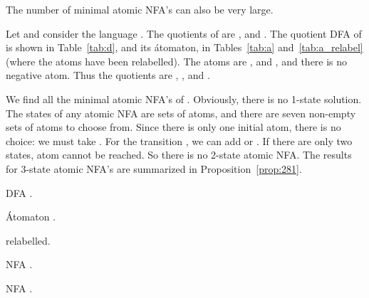 \documentclass{llncs}
\begin{document}
The number of minimal atomic NFA's can also be very large. 
\begin{example}
\label{ex:atomicminimal}
Let  and consider the language .
The quotients of  are ,  and .
The quotient DFA of  is shown in Table~\ref{tab:d}, and its \'atomaton, in Tables~\ref{tab:a} and~\ref{tab:a_relabel} (where the atoms have been relabelled). 
The atoms  are ,  and , and there is no negative atom.
Thus the quotients are , , and .

We find all the minimal atomic NFA's of .
Obviously, there is no 1-state solution.
The states of any atomic NFA are sets of atoms, and 
there are seven non-empty sets of atoms to choose from. 
Since there is only one initial atom, there is no choice: we must take .
For the transition , we can add  or . 
If there are only two states, atom  cannot be reached. So there is no  2-state atomic NFA.
The results for 3-state atomic NFA's  are summarized in Proposition~\ref{prop:281}. 


\begin{table}[hbt]
\begin{minipage}[b]{0.3\linewidth}
\caption{DFA .}
\label{tab:d}
\begin{center}

\end{center}
\end{minipage}
\hspace{0.1cm}
\begin{minipage}[b]{0.3\linewidth}
\caption{\'Atomaton .}
\label{tab:a}
\begin{center}

\end{center}
\end{minipage}
\hspace{0.3cm}
\begin{minipage}[b]{0.3\linewidth}
\caption{ relabelled.}
\label{tab:a_relabel}
\begin{center}

\end{center}
\end{minipage}
\end{table}

\begin{table}[hbt]
\begin{minipage}[b]{0.45\linewidth}
\caption{NFA .}
\label{tab:fn1}
\begin{center}

\end{center}
\end{minipage}
\hspace{0.2cm}
\begin{minipage}[b]{0.45\linewidth}
\caption{NFA .}
\label{tab:fn9}
\begin{center}


\end{center}
\end{minipage}
\end{table}
\end{example}
\end{document}
